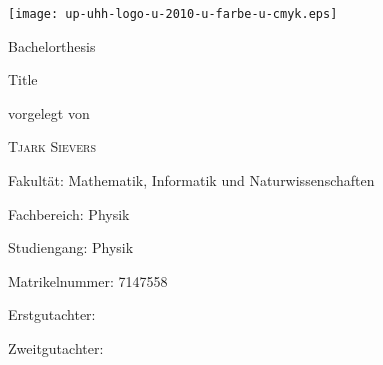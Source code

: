 \documentclass[main.tex]{subfiles}
\begin{document}
\begin{titlepage}
    \texttt{[image: up-uhh-logo-u-2010-u-farbe-u-cmyk.eps]}\par
    \vspace{4\baselineskip}

    \begin{center}
        {\Large\textcolor{UHHred}{Bachelorthesis}\par}

        {\Huge Title\par}

        \vspace{4\baselineskip}

        vorgelegt von\par

        {\Large\textsc{Tjark Sievers}\par}
    \end{center}

    \vfill

    Fakultät: Mathematik, Informatik und Naturwissenschaften\par
    Fachbereich: Physik\par
    Studiengang: Physik\par
    Matrikelnummer: 7147558\par
 
    Erstgutachter: \par
    Zweitgutachter: \par
\end{titlepage}
\end{document}
